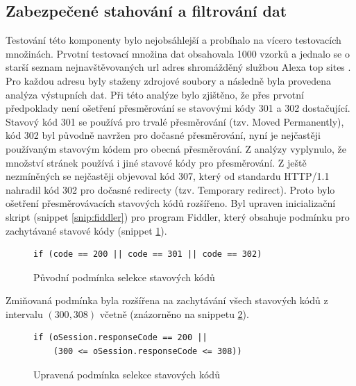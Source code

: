 \documentclass[thesis=M,czech,hidelinks]{FITthesis}[2013/05/06]
\begin{document}
\subsection{Zabezpečené stahování a filtrování dat}
Testování této komponenty bylo nejobsáhlejší a probíhalo na vícero testovacích množinách. Prvotní testovací množina dat obsahovala 1000 vzorků a jednalo se o starší seznam nejnavštěvovaných url adres shromážděný službou Alexa top sites \cite{alexa}. Pro každou adresu byly staženy zdrojové soubory a následně byla provedena analýza výstupních dat. Při této analýze bylo zjištěno, že přes prvotní předpoklady není ošetření přesměrování se stavovými kódy 301 a 302 dostačující. Stavový kód 301 se používá pro trvalé přesměrování (tzv. Moved Permanently), kód 302 byl původně navržen pro dočasné přesměrování, nyní je nejčastěji používaným stavovým kódem pro obecná přesměrování. Z analýzy vyplynulo, že množství stránek používá i jiné stavové kódy pro přesměrování. Z ještě nezmíněných se nejčastěji objevoval kód 307, který od standardu HTTP/1.1 nahradil kód 302 pro dočasné redirecty (tzv. Temporary redirect). Proto bylo ošetření přesměrovávacích stavových kódů rozšířeno. Byl upraven inicializační skript (snippet \ref{snip:fiddler}) pro program Fiddler, který obsahuje podmínku pro zachytávané stavové kódy (snippet \ref{snip:fiddler_new}). 

\begin{figure}[h]               
	\begin{verbatim}
if (code == 200 || code == 301 || code == 302)
	\end{verbatim}      
	\caption{Původní podmínka selekce stavových kódů}
	\label{snip:fiddler_new}
\end{figure}

Zmiňovaná podmínka byla rozšířena na zachytávání všech stavových kódů z intervalu $(300,308)$ včetně (znázorněno na snippetu \ref{snip:fiddler_new_new}).
\begin{figure}[h]               
	\begin{verbatim}
if (oSession.responseCode == 200 || 
    (300 <= oSession.responseCode <= 308))
	\end{verbatim}      
	\caption{Upravená podmínka selekce stavových kódů}
	\label{snip:fiddler_new_new}
\end{figure}
\end{document}
